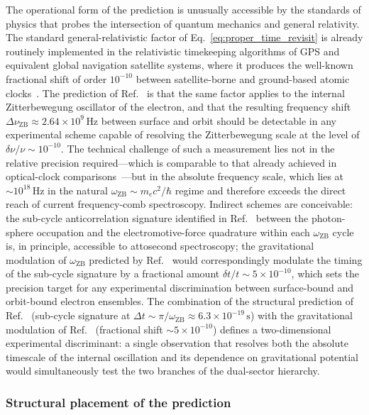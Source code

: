 \documentclass[%
 reprint, amsmath,amssymb, aps, prb, ]{revtex4-2}
\numberwithin{equation}{section}
\newcommand{\omZB}{\omega_{\text{ZB}}}
\begin{document}
The operational form of the prediction is unusually accessible by the standards of physics that probes the intersection of quantum mechanics and general relativity. The standard general-relativistic factor of Eq.~\eqref{eq:proper_time_revisit} is already routinely implemented in the relativistic timekeeping algorithms of GPS and equivalent global navigation satellite systems, where it produces the well-known fractional shift of order $10^{-10}$ between satellite-borne and ground-based atomic clocks~\cite{ashby2003}. The prediction of Ref.~\cite{hanamura22} is that the same factor applies to the internal Zitterbewegung oscillator of the electron, and that the resulting frequency shift $\Delta\nu_{\text{ZB}} \approx 2.64 \times 10^{9}\,\text{Hz}$ between surface and orbit should be detectable in any experimental scheme capable of resolving the Zitterbewegung scale at the level of $\delta\nu/\nu \sim 10^{-10}$. The technical challenge of such a measurement lies not in the relative precision required---which is comparable to that already achieved in optical-clock comparisons~\cite{ludlow2015}---but in the absolute frequency scale, which lies at $\sim 10^{18}\,\text{Hz}$ in the natural $\omZB \sim m_e c^2/\hbar$ regime and therefore exceeds the direct reach of current frequency-comb spectroscopy. Indirect schemes are conceivable: the sub-cycle anticorrelation signature identified in Ref.~\cite{hanamura54} between the photon-sphere occupation and the electromotive-force quadrature within each $\omZB$ cycle is, in principle, accessible to attosecond spectroscopy; the gravitational modulation of $\omZB$ predicted by Ref.~\cite{hanamura22} would correspondingly modulate the timing of the sub-cycle signature by a fractional amount $\delta t/t \sim 5 \times 10^{-10}$, which sets the precision target for any experimental discrimination between surface-bound and orbit-bound electron ensembles. The combination of the structural prediction of Ref.~\cite{hanamura54} (sub-cycle signature at $\Delta t \sim \pi/\omZB \approx 6.3 \times 10^{-19}\,\text{s}$) with the gravitational modulation of Ref.~\cite{hanamura22} (fractional shift $\sim 5 \times 10^{-10}$) defines a two-dimensional experimental discriminant: a single observation that resolves both the absolute timescale of the internal oscillation and its dependence on gravitational potential would simultaneously test the two branches of the dual-sector hierarchy.

\subsubsection{Structural placement of the prediction}
\end{document}
